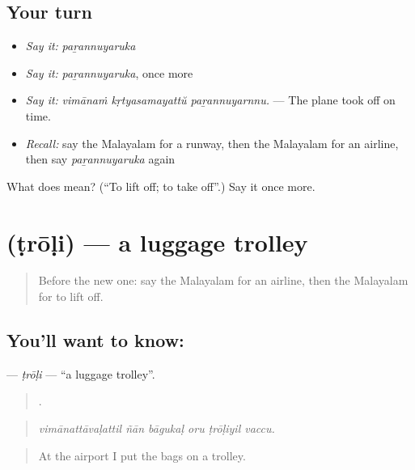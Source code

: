 \subsection*{Your turn}
\begin{itemize}
\raggedright
  \item \emph{Say it:} \emph{paṟannuyaruka}
  \item \emph{Say it:} \emph{paṟannuyaruka}, once more
  \item \emph{Say it:} \emph{vimānaṁ kṛtyasamayattŭ paṟannuyarnnu.} — The plane took off on time.
  \item \emph{Recall:} say the Malayalam for a runway, then the Malayalam for an airline, then say \emph{paṟannuyaruka} again
\end{itemize}

\begin{tcolorbox}[breakable,colback=teal!4,colframe=teal!35!black,title={Before you move on}]
What does  mean? (\textquotedblleft{}To lift off; to take off\textquotedblright{}.) Say it once more.
\end{tcolorbox}
\section[\texorpdfstring{\ml{ട്രോളി} (ṭrōḷi)}{ട്രോളി (ṭrōḷi)}]{ (ṭrōḷi) — a luggage trolley}

\label{lesson:ML-C463-troli}



\begin{quote}
Before the new one: say the Malayalam for an airline, then the Malayalam for to lift off.
\end{quote}

\subsection*{You'll want to know: }
\textbf{} — \emph{ṭrōḷi} — \textquotedblleft{}a luggage trolley\textquotedblright{}.

\begin{quote}
     .
\end{quote}

\begin{quote}
\emph{vimānattāvaḷattil ñān bāgukaḷ oru ṭrōḷiyil vaccu.}
\end{quote}

\begin{quote}
At the airport I put the bags on a trolley.
\end{quote}

